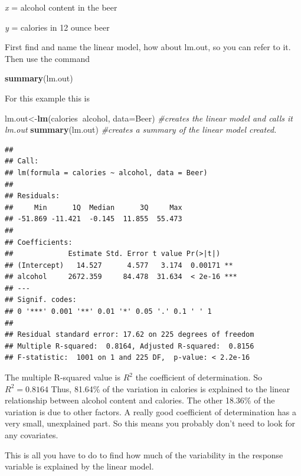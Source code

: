 \documentclass[
]{book}
\newenvironment{Shaded}{\begin{snugshade}}{\end{snugshade}}
\newcommand{\CommentTok}[1]{\textcolor[rgb]{0.56,0.35,0.01}{\textit{#1}}}
\newcommand{\DataTypeTok}[1]{\textcolor[rgb]{0.13,0.29,0.53}{#1}}
\newcommand{\KeywordTok}[1]{\textcolor[rgb]{0.13,0.29,0.53}{\textbf{#1}}}
\newcommand{\NormalTok}[1]{#1}
\newcommand{\OperatorTok}[1]{\textcolor[rgb]{0.81,0.36,0.00}{\textbf{#1}}}
\begin{document}
\emph{x} = alcohol content in the beer

\emph{y} = calories in 12 ounce beer

First find and name the linear model, how about lm.out, so you can refer to it. Then use the command

\begin{Shaded}
\begin{Highlighting}[]
\KeywordTok{summary}\NormalTok{(lm.out)}
\end{Highlighting}
\end{Shaded}

For this example this is

\begin{Shaded}
\begin{Highlighting}[]
\NormalTok{lm.out<-}\KeywordTok{lm}\NormalTok{(calories}\OperatorTok{~}\NormalTok{alcohol, }\DataTypeTok{data=}\NormalTok{Beer) }\CommentTok{#creates the linear model and calls it lm.out}
\KeywordTok{summary}\NormalTok{(lm.out) }\CommentTok{#creates a summary of the linear model created.}
\end{Highlighting}
\end{Shaded}

\begin{verbatim}
## 
## Call:
## lm(formula = calories ~ alcohol, data = Beer)
## 
## Residuals:
##     Min      1Q  Median      3Q     Max 
## -51.869 -11.421  -0.145  11.855  55.473 
## 
## Coefficients:
##             Estimate Std. Error t value Pr(>|t|)    
## (Intercept)   14.527      4.577   3.174  0.00171 ** 
## alcohol     2672.359     84.478  31.634  < 2e-16 ***
## ---
## Signif. codes:  
## 0 '***' 0.001 '**' 0.01 '*' 0.05 '.' 0.1 ' ' 1
## 
## Residual standard error: 17.62 on 225 degrees of freedom
## Multiple R-squared:  0.8164,	Adjusted R-squared:  0.8156 
## F-statistic:  1001 on 1 and 225 DF,  p-value: < 2.2e-16
\end{verbatim}

The multiple R-squared value is \(R^2\) the coefficient of determination. So \(R^2=0.8164\)
Thus, 81.64\% of the variation in calories is explained to the linear relationship between alcohol content and calories. The other 18.36\% of the variation is due to other factors. A really good coefficient of determination has a very small, unexplained part. So this means you probably don't need to look for any covariates.

This is all you have to do to find how much of the variability in the response variable is explained by the linear model.
\end{document}
